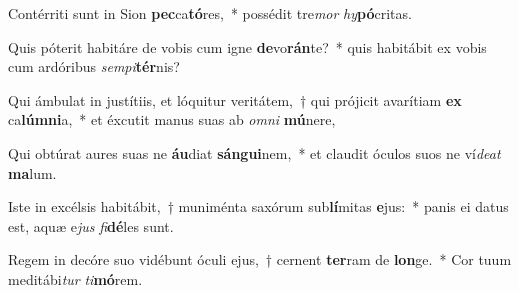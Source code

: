\item Contérriti sunt in Sion \textbf{pec}ca\textbf{tó}res,~* possédit tre\textit{mor} \textit{hy}\textbf{pó}critas.
\item Quis póterit habitáre de vobis cum igne \textbf{de}vo\textbf{rán}te?~* quis habitábit ex vobis cum ardóribus \textit{sem}\textit{pi}\textbf{tér}nis?
\item Qui ámbulat in justítiis, et lóquitur veritátem,~† qui prójicit avarítiam \textbf{ex} ca\textbf{lúm}\textbf{ni}a,~* et éxcutit manus suas ab \textit{om}\textit{ni} \textbf{mú}nere,
\item Qui obtúrat aures suas ne \textbf{áu}diat \textbf{sán}\textbf{gui}nem,~* et claudit óculos suos ne ví\textit{de}\textit{at} \textbf{ma}lum.
\item Iste in excélsis habitábit,~† muniménta saxórum sub\textbf{lí}mitas \textbf{e}jus:~* panis ei datus est, aquæ e\textit{jus} \textit{fi}\textbf{dé}les sunt.
\item Regem in decóre suo vidébunt óculi ejus,~† cernent \textbf{ter}ram de \textbf{lon}ge.~* Cor tuum meditábi\textit{tur} \textit{ti}\textbf{mó}rem.
